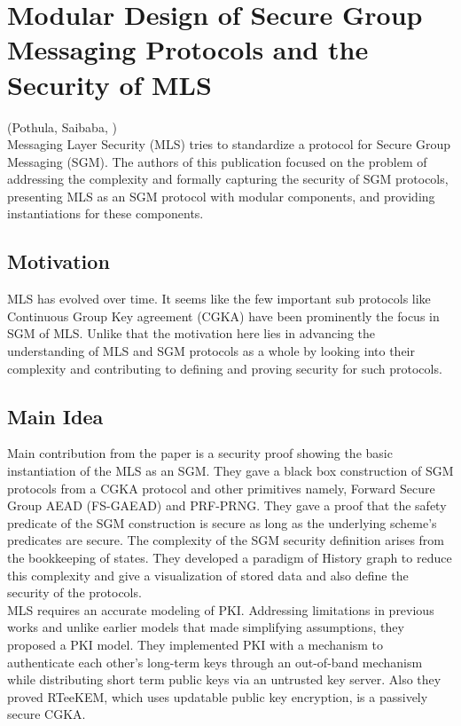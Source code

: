 \section{Modular Design of Secure Group Messaging Protocols and the Security of MLS}
\label{sec:CCS:ACDT21}
(Pothula, Saibaba, \cite{CCS:ACDT21,EPRINT:ACDT21})\\

Messaging Layer Security (MLS) tries to standardize a protocol for Secure Group Messaging (SGM). The authors of this publication focused on the problem of addressing the complexity and formally capturing the security of SGM protocols, presenting MLS as an SGM protocol with modular components, and providing instantiations for these components.

\subsection{Motivation}

MLS has evolved over time. It seems like the few important sub protocols like Continuous Group Key agreement (CGKA) have been prominently the focus in SGM of MLS. Unlike that the motivation here lies in advancing the understanding of MLS and SGM protocols as a whole by looking into their complexity and contributing to defining and proving security for such protocols.

\subsection{Main Idea}

Main contribution from the paper is a security proof showing the basic instantiation of the MLS as an SGM. They gave a black box construction of SGM protocols from a CGKA protocol and other primitives namely, Forward Secure Group AEAD (FS-GAEAD) and PRF-PRNG. They gave a proof that the safety predicate of the SGM construction is secure as long as the underlying scheme’s predicates are secure. The complexity of the SGM security definition arises from the bookkeeping of states. They developed a paradigm of History graph to reduce this complexity and give a visualization of stored data and also define the security of the protocols.\\

MLS requires an accurate modeling of PKI. Addressing limitations in previous works and unlike earlier models that made simplifying assumptions, they proposed a PKI model. They implemented PKI with a mechanism to authenticate each other's long-term keys through an out-of-band mechanism while distributing short term public keys via an untrusted key server. Also they proved RTeeKEM, which uses updatable public key encryption, is a passively secure CGKA.

